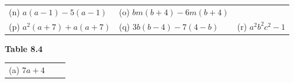 \begin{enumerate}[noitemsep, label=\textbf{\arabic*}. ]
{{\begin{center}
\begin{tabular}[t]{|l|l|l|}
        (n) $a\left(a-1\right)-5\left(a-1\right)$ &
        (o) $bm\left(b+4\right)-6m\left(b+4\right)$%
     \tabularnewline\cline{1-1}\cline{2-2}\cline{3-3}
        (p) ${a}^{2}\left(a+7\right)+a\left(a+7\right)$ &
        (q) $3b\left(b-4\right)-7\left(4-b\right)$ &
        (r) ${a}^{2}{b}^{2}{c}^{2}-1$%
     \tabularnewline\cline{1-1}\cline{2-2}\cline{3-3}
    \end{tabular}
      \end{center}
    \begin{center}{\small\bfseries Table 8.4}\end{center}
          }{ %
        \begin{center}
      \label{m39383*id270628}
    \noindent
      \tablelasttail{}
      \begin{xtabular}[t]{|l|l|l|}\hline
        (a) $7a+4$ &

\end{xtabular}
\end{center}}}
\end{enumerate}
